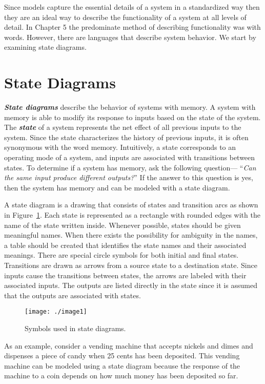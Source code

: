 Since models capture the essential details of a system in a standardized
way then they are an ideal way to describe the functionality of a system
at all levels of detail. In Chapter 5 the predominate method of
describing functionality was with words. However, there are languages
that describe system behavior. We start by examining state diagrams.

\section{State Diagrams}
\label{section:state-diagrams}

\emph{\textbf{State diagrams}} describe the behavior of systems with
memory. A system with memory is able to modify its response to inputs
based on the state of the system. The \emph{\textbf{state}} of a system
represents the net effect of all previous inputs to the system. Since
the state characterizes the history of previous inputs, it is often
synonymous with the word memory. Intuitively, a state corresponds to an
operating mode of a system, and inputs are associated with transitions
between states. To determine if a system has memory, ask the following
question--- ``\emph{Can the same input produce different outputs?}'' If
the answer to this question is yes, then the system has memory and can
be modeled with a state diagram.

A state diagram is a drawing that consists of states and transition arcs
as shown in Figure~\ref{figure:stateDiagramSymbols}. 
Each state is represented as a rectangle with
rounded edges with the name of the state written inside. Whenever
possible, states should be given meaningful names. When there exists the
possibility for ambiguity in the names, a table should be created that
identifies the state names and their associated meanings. There are
special circle symbols for both initial and final states. Transitions
are drawn as arrows from a source state to a destination state. Since
inputs cause the transitions between states, the arrows are labeled with
their associated inputs. The outputs are listed directly in the state
since it is assumed that the outputs are associated with states.


\begin{figure}
\texttt{[image: ./image1]}
\caption{Symbols used in state diagrams.}
\label{figure:stateDiagramSymbols}
\end{figure}


As an example, consider a vending machine that accepts nickels and dimes
and dispenses a piece of candy when 25 cents has been deposited. This
vending machine can be modeled using a state diagram because the
response of the machine to a coin depends on how much money has been
deposited so far.

